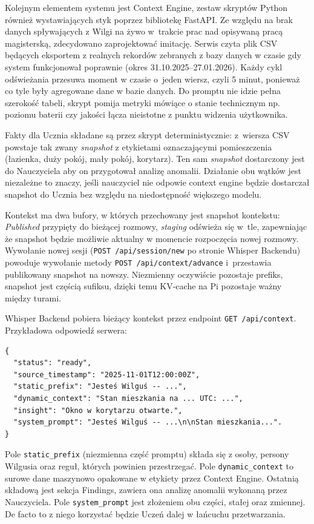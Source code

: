 Kolejnym elementem systemu jest Context Engine, zestaw skryptów Python również wystawiających styk poprzez bibliotekę FastAPI. Ze względu na brak danych spływających z Wilgi na żywo w~trakcie prac nad opisywaną pracą magisterską, zdecydowano zaprojektować imitację. Serwis czyta plik CSV będących eksportem z realnych rekordów zebranych z bazy danych w czasie gdy system funkcjonował poprawnie (okres 31.10.2025--27.01.2026).
Każdy cykl odświeżania przesuwa moment w czasie o~jeden wiersz, czyli 5 minut, ponieważ co tyle były agregowane dane w bazie danych.
Do promptu nie idzie pełna szerokość tabeli, skrypt pomija metryki mówiące o stanie technicznym np. poziomu baterii czy jakości łącza nieistotne z punktu widzenia użytkownika.

Fakty dla Ucznia składane są przez skrypt deterministycznie: z~wiersza CSV powstaje
tak zwany \emph{snapshot} z etykietami oznaczającymi pomieszczenia (łazienka, duży pokój,
mały pokój, korytarz). Ten sam \emph{snapshot} dostarczony jest do Nauczyciela aby on przygotował analizę anomalii. Działanie obu wątków jest niezależne to znaczy, jeśli nauczyciel nie odpowie context engine będzie dostarczał snapshot do Ucznia bez względu na niedostępność większego modelu.

Kontekst ma dwa bufory, w których przechowany jest snapshot kontekstu: \emph{Published} przypięty do bieżącej
rozmowy, \emph{staging} odświeża się w~tle, zapewniając że snapshot będzie możliwie aktualny w momencie rozpoczęcia nowej rozmowy. Wywołanie nowej sesji
(\texttt{POST /api/session/new} po stronie Whisper Backendu) powoduje wywołanie metody \texttt{POST /api/context/advance} i~przestawia publikowany snapshot na nowszy.
Niezmienny oczywiście pozostaje prefiks, snapshot jest częścią sufiksu, dzięki temu KV-cache
 na Pi pozostaje ważny między turami.

Whisper Backend pobiera bieżący kontekst przez endpoint
\texttt{GET /api/context}. Przykładowa odpowiedź serwera:

\begin{verbatim}
{
  "status": "ready",
  "source_timestamp": "2025-11-01T12:00:00Z",
  "static_prefix": "Jesteś Wilguś -- ...",
  "dynamic_context": "Stan mieszkania na ... UTC: ...",
  "insight": "Okno w korytarzu otwarte.",
  "system_prompt": "Jesteś Wilguś -- ...\n\nStan mieszkania...".
}
\end{verbatim}

Pole \texttt{static\_prefix} (niezmienna część promptu) składa się z osoby, persony Wilgusia oraz reguł, których powinien przestrzegać. Pole \texttt{dynamic\_context} to surowe dane maszynowo opakowane w etykiety przez Context Engine. Ostatnią składową jest sekcja Findings, zawiera ona analizę anomalii wykonaną przez Nauczyciela. Pole \texttt{system\_prompt} jest złożeniem obu części, stałej oraz zmiennej.
De facto to z niego korzystać będzie Uczeń dalej w łańcuchu przetwarzania. 

